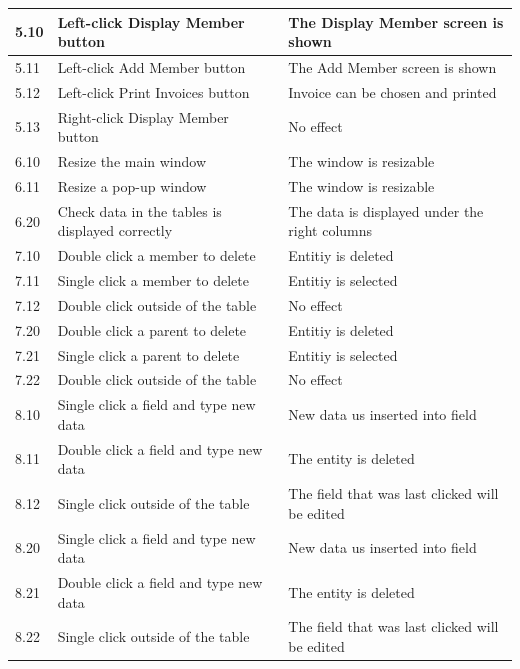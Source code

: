 \begin{landscape}
\begin{center}
\begin{longtable}{|p{2cm}|p{5cm}|p{8cm}|}
        5.10 & Left-click Display Member button & The Display Member screen is shown \\ \hline
        5.11 & Left-click Add Member button & The Add Member screen is shown \\ \hline
        5.12 & Left-click Print Invoices button & Invoice can be chosen and printed \\ \hline
        5.13 & Right-click Display Member button & No effect \\ \hline
        
        6.10 & Resize the main window & The window is resizable \\ \hline
        6.11 & Resize a pop-up window & The window is resizable\\ \hline
        
        6.20 & Check data in the tables is displayed correctly & The data is displayed under the right columns \\ \hline

       \rowcolor{lightgrey} 7.10 & Double click a member to delete & Entitiy is deleted \\ \hline
       \rowcolor{lightgrey} 7.11 & Single click a member to delete & Entitiy is selected \\ \hline
       \rowcolor{lightgrey} 7.12 & Double click outside of the table & No effect \\ \hline

       \rowcolor{lightgrey} 7.20 & Double click a parent to delete & Entitiy is deleted \\ \hline
       \rowcolor{lightgrey} 7.21 & Single click a parent to delete & Entitiy is selected\\ \hline
       \rowcolor{lightgrey} 7.22 & Double click outside of the table & No effect \\ \hline
        
       \rowcolor{lightgrey} 8.10 & Single click a field and type new data & New data us inserted into field \\ \hline
       \rowcolor{lightgrey} 8.11 & Double click a field and type new data & The entity is deleted \\ \hline
       \rowcolor{lightgrey} 8.12 & Single click outside of the table & The field that was last clicked will be edited \\ \hline
        
       \rowcolor{lightgrey} 8.20 & Single click a field and type new data &  New data us inserted into field \\ \hline
       \rowcolor{lightgrey} 8.21 & Double click a field and type new data & The entity is deleted \\ \hline
       \rowcolor{lightgrey} 8.22 & Single click outside of the table & The field that was last clicked will be edited \\ \hline


\end{longtable}
\end{center}
\end{landscape}
